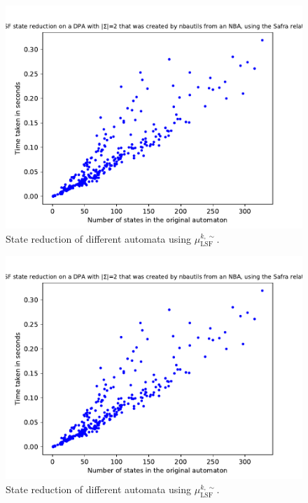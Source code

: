 \begin{figure}
	\centering
	\includegraphics[page=3,height=.4\textheight]{../data/analysis/lsf/detnbaut_safra_ap1.pdf} 
	\caption{State reduction of different automata using $\mu_\text{LSF}^{k,\sim}$.}
	\label{fig:lsf:empirical_safra_reduct_rel}
\end{figure}

\begin{figure}
	\centering
	\includegraphics[page=1,height=.4\textheight]{../data/analysis/lsf/detnbaut_safra_ap1.pdf} 
	\caption{State reduction of different automata using $\mu_\text{LSF}^{k,\sim}$.}
	\label{fig:lsf:empirical_safra_time}
\end{figure}



